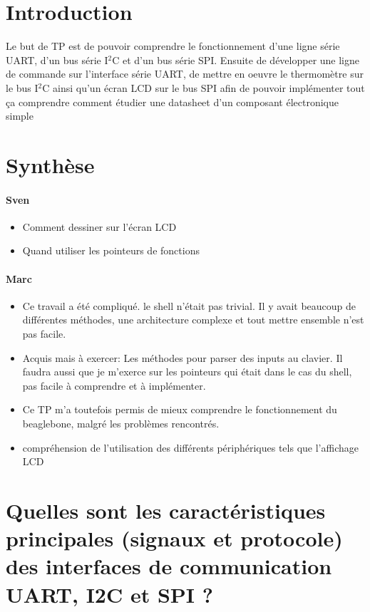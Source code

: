 \section{Introduction}
Le but de TP est de pouvoir comprendre le fonctionnement d'une ligne série UART, d'un bus série I$^2$C et d'un bus série SPI. Ensuite de développer une ligne de commande sur l'interface série UART, de mettre en oeuvre le thermomètre sur le bus I$^2$C ainsi qu'un écran LCD sur le bus SPI afin de pouvoir implémenter tout ça comprendre comment étudier une datasheet d'un composant électronique simple
\section{Synthèse}

\paragraph{Sven}
\begin{itemize}
   \item Comment dessiner sur l'écran LCD
   \item Quand utiliser les pointeurs de fonctions
\end{itemize}

\paragraph{Marc}
\begin{itemize}
    \item Ce travail a été compliqué. le shell n'était pas trivial. Il y avait beaucoup de différentes méthodes, une architecture complexe et tout mettre ensemble n'est pas facile.
    \item Acquis mais à exercer: Les méthodes pour parser des inputs au clavier.  Il faudra aussi que je m'exerce sur les pointeurs qui était dans le cas du shell, pas facile à comprendre et à implémenter.
    \item Ce TP m'a toutefois permis de mieux comprendre le fonctionnement du beaglebone, malgré les problèmes rencontrés.
    \item compréhension de l'utilisation des différents périphériques tels que l'affichage LCD
\end{itemize}
 
\section{Quelles sont les caractéristiques principales (signaux et protocole) des interfaces de communication UART, I2C et SPI ?}
